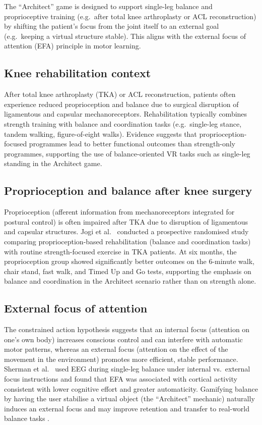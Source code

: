 The ``Architect'' game is designed to support single-leg balance and proprioceptive training (e.g.\ after total knee arthroplasty or ACL reconstruction) by shifting the patient's focus from the joint itself to an external goal (e.g.\ keeping a virtual structure stable). This aligns with the external focus of attention (EFA) principle in motor learning.

\subsection{Knee rehabilitation context}

After total knee arthroplasty (TKA) or ACL reconstruction, patients often experience reduced proprioception and balance due to surgical disruption of ligamentous and capsular mechanoreceptors. Rehabilitation typically combines strength training with balance and coordination tasks (e.g.\ single-leg stance, tandem walking, figure-of-eight walks). Evidence suggests that proprioception-focused programmes lead to better functional outcomes than strength-only programmes, supporting the use of balance-oriented VR tasks such as single-leg standing in the Architect game.

\subsection{Proprioception and balance after knee surgery}

Proprioception (afferent information from mechanoreceptors integrated for postural control) is often impaired after TKA due to disruption of ligamentous and capsular structures. Jogi et al.\ \cite{jogi2024proprioception} conducted a prospective randomised study comparing proprioception-based rehabilitation (balance and coordination tasks) with routine strength-focused exercise in TKA patients. At six months, the proprioception group showed significantly better outcomes on the 6-minute walk, chair stand, fast walk, and Timed Up and Go tests, supporting the emphasis on balance and coordination in the Architect scenario rather than on strength alone.

\subsection{External focus of attention}

The constrained action hypothesis suggests that an internal focus (attention on one's own body) increases conscious control and can interfere with automatic motor patterns, whereas an external focus (attention on the effect of the movement in the environment) promotes more efficient, stable performance. Sherman et al.\ \cite{sherman2021external} used EEG during single-leg balance under internal vs.\ external focus instructions and found that EFA was associated with cortical activity consistent with lower cognitive effort and greater automaticity. Gamifying balance by having the user stabilise a virtual object (the ``Architect'' mechanic) naturally induces an external focus and may improve retention and transfer to real-world balance tasks \cite{jogi2024proprioception}.

